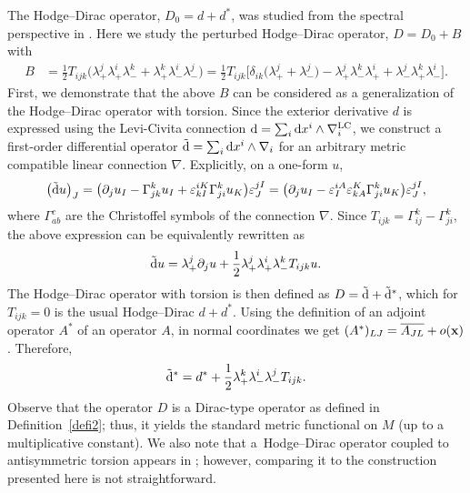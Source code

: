 \documentclass[10pt,a4paper]{amsart}
\numberwithin{equation}{section}
\theoremstyle{definition}
\begin{document}
The Hodge--Dirac operator, $D_0=d+d^\ast$, was studied from the spectral perspective in \cite{dabrowski2024a}. Here we study
the perturbed Hodge--Dirac operator, $D=D_0+B$ with
\begin{align}
 B&=\frac{1}{2} T_{ijk}\bigl(\lambda_+^j\lambda_+^i\lambda_-^k+\lambda_+^k\lambda_-^i\lambda_-^j\bigr) =\frac{1}{2}T_{ijk}\bigl[\delta_{ik}\bigl(\lambda^j_++\lambda^j_-\bigr)-\lambda^j_+\lambda^k_-\lambda^i_+ + \lambda^j_-\lambda^k_+ \lambda^i_-\bigr].\label{eq:HDB}
\end{align}
First, we demonstrate that the above $B$ can be considered as a generalization of the Hodge--Dirac operator with torsion. Since the exterior derivative $d$ is expressed using the Levi-Civita
connection ${\rm d} = \sum_i {\rm d}x^i \wedge \nabla^{\mathrm{LC}}_i$, we construct
a first-order differential operator $\tilde{\rm d} = \sum_i {\rm d}x^i \wedge \nabla_i$ for an arbitrary metric compatible linear connection $\nabla$. Explicitly, on a one-form $u$,
\[
 \bigl(\tilde{\rm d} u\bigr)_J=\bigl(\partial_j u_I-\Gamma^k_{jk} u_I + \varepsilon^{iK}_{kI} \Gamma^k_{ji}u_K\bigr)\varepsilon^{jI}_J=\bigl(\partial_j u_I-\varepsilon^{iA}_I\varepsilon^{K}_{kA} \Gamma^k_{ji}u_K\bigr)\varepsilon^{jI}_J,
\]
where $\Gamma^{c}_{ab}$ are the Christoffel symbols of the connection $\nabla$. Since $T_{ijk}=\Gamma^{k}_{ij}-\Gamma^{k}_{ji}$, the above expression can be equivalently rewritten as
\[
 \tilde{\rm d} u=\lambda_+^j \partial_j u + \frac{1}{2}\lambda_+^j \lambda_+^i\lambda_-^k T_{ijk}u.
\]
The Hodge--Dirac operator with torsion is then defined as $D=\tilde{\rm d}+\tilde{\rm d}^\ast$, which for $T_{ijk}=0$ is the usual
Hodge--Dirac $d+d^*$. Using the definition of an adjoint operator $A^\ast$ of an operator $A$, in normal coordinates we get
$
 (A^\ast)_{LJ}=\overline{A_{JL}} + o({\bf x})$.
Therefore,
\[
 \tilde{\rm d}^\ast=d^\ast+\frac{1}{2}\lambda_+^k \lambda_-^i \lambda_-^j T_{ijk}.
\]
Observe that the operator $D$ is a Dirac-type operator as defined in Definition~\ref{defi2}; thus, it yields the standard metric functional on $M$ (up to a multiplicative constant). We also note that a~Hodge--Dirac operator coupled to antisymmetric torsion appears in \cite{wang2024}; however, comparing it to the construction presented here is not straightforward.
\end{document}
